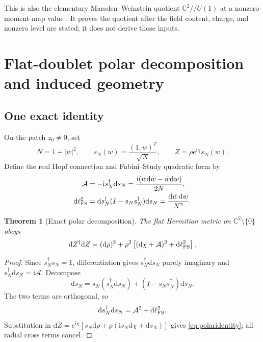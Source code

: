 \documentclass[11pt]{article}
\numberwithin{equation}{section}
\newcommand{\CC}{\mathbb C}
\newcommand{\dd}{\mathrm d}
\newcommand{\ii}{\mathrm i}
\newtheorem{theorem}{Theorem}[section]
\begin{document}
This is also the elementary Marsden--Weinstein quotient
\(\CC^2//U(1)\) at a nonzero moment-map value
\cite{MarsdenWeinstein1974}.  It proves the quotient after the field content,
charge, and nonzero level are stated; it does not derive those inputs.

\section{Flat-doublet polar decomposition and induced geometry}

\subsection{One exact identity}

On the patch \(z_0\ne0\), set
\begin{equation}
 N=1+|w|^2,
 \qquad
 s_N(w)=\frac{(1,w)^T}{\sqrt N},
 \qquad
 Z=\rho e^{\ii\chi}s_N(w).
 \label{eq:northsection}
\end{equation}
Define the real Hopf connection and Fubini--Study quadratic form by
\begin{align}
 \mathcal A&=-\ii s_N^\dagger\dd s_N
 =\frac{\ii(w\dd\bar w-\bar w\dd w)}{2N},
 \label{eq:hopfconnection}\\
 \dd\ell_{\rm FS}^2&=
 \dd s_N^\dagger(I-s_Ns_N^\dagger)\dd s_N
 =\frac{\dd\bar w\,\dd w}{N^2}.
 \label{eq:fsmetric}
\end{align}

\begin{theorem}[Exact polar decomposition]
The flat Hermitian metric on \(\CC^2\setminus\{0\}\) obeys
\begin{equation}
 \dd Z^\dagger\dd Z
 =(\dd\rho)^2+\rho^2\left[(\dd\chi+\mathcal A)^2
 +\dd\ell_{\rm FS}^2\right].
 \label{eq:polaridentity}
\end{equation}
\end{theorem}

\begin{proof}
Since \(s_N^\dagger s_N=1\), differentiation gives
\(s_N^\dagger\dd s_N\) purely imaginary and
\(s_N^\dagger\dd s_N=\ii\mathcal A\).  Decompose
\begin{equation}
 \dd s_N=s_N(s_N^\dagger\dd s_N)
 +(I-s_Ns_N^\dagger)\dd s_N.
\end{equation}
The two terms are orthogonal, so
\begin{equation}
 \dd s_N^\dagger\dd s_N
 =\mathcal A^2+\dd\ell_{\rm FS}^2.
\end{equation}
Substitution in
\(
 \dd Z=e^{\ii\chi}[s_N\dd\rho+\rho(\ii s_N\dd\chi+\dd s_N)]
\)
gives \eqref{eq:polaridentity}; all radial cross terms cancel.
\end{proof}
\end{document}
